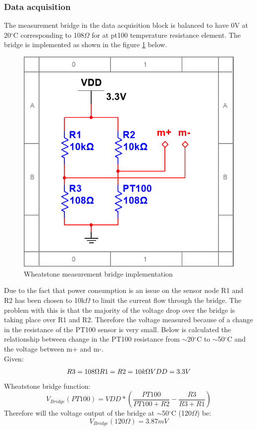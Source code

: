 \subsubsection{Data acquisition}
The measurement bridge in the data acquisition block is balanced to have 0V at 20$^\circ$C corresponding to 108$\Omega$ for at pt100 temperature resistance element. The bridge is implemented as shown in the figure \ref{fig:m_bridge} below.

\begin{figure}[H]
	\centering
	\includegraphics[width=.4\textwidth]{billeder/m_bridge}
	\caption{Wheatstone measurement bridge implementation}
	\label{fig:m_bridge}
\end{figure}

Due to the fact that power consumption is an issue on the sensor node R1 and R2 has been chosen to 10k$\Omega$ to limit the current flow through the bridge. The problem with this is that the majority of the voltage drop over the bridge is taking place over R1 and R2. Therefore the voltage measured because of a change in the resistance of the PT100 sensor is very small. Below is calculated the relationship between change in the PT100 resistance from $\sim$20$^\circ$C to $\sim$50$^\circ$C and the voltage between m+ and m-.\\
Given:
\begin{equation}
		R3=108\Omega $\\$ R1=R2=10k\Omega $\\$ VDD=3.3V
\end{equation}
Wheatstone bridge function:
\begin{equation}
		V_{Bridge}(PT100)=VDD*\left(\frac{PT100}{PT100+R2}-\frac{R3}{R3+R1}\right)
		\label{eq:vbridge}
\end{equation}
Therefore will the voltage output of the bridge at $\sim$50$^\circ$C (120$\Omega$) be:
\begin{equation}
	V_{Bridge}(120\Omega)= 3.87mV
\end{equation}

